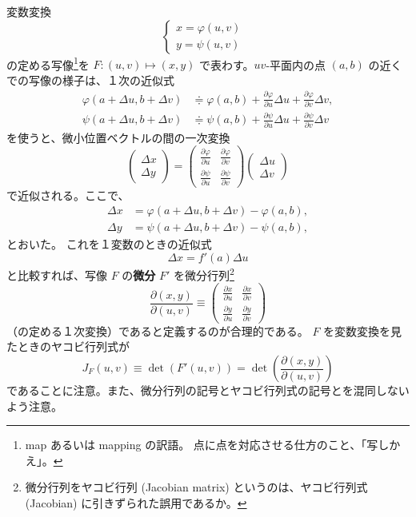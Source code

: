 \documentclass[a4paper]{jsarticle}
\theoremstyle{definition}
\theoremstyle{remark}
\newcommand{\del}{\partial}
\begin{document}
変数変換
\[
\begin{cases}
x = \varphi(u,v) &\\
y = \psi(u,v) &
\end{cases}
\]
の定める写像\footnote{map あるいは mapping の訳語。
点に点を対応させる仕方のこと、「写しかえ」。}を $F: (u,v) \mapsto (x,y)$ で表わす。$uv$-平面内の点
$(a,b)$ の近くでの写像の様子は、１次の近似式
\begin{align*}
\varphi(a+\Delta u,b+\Delta v) &\doteqdot \varphi(a,b) + 
\frac{\del \varphi}{\del u}\Delta u + \frac{\del \varphi}{\del v}\Delta v,\\
\psi(a+\Delta u,b+\Delta v) &\doteqdot \psi(a,b) + 
\frac{\del \psi}{\del u}\Delta u + \frac{\del \psi}{\del v}\Delta v
\end{align*}
を使うと、微小位置ベクトルの間の一次変換
\[
\begin{pmatrix}
\Delta x\\ \Delta y
\end{pmatrix}
= 
\begin{pmatrix}
\frac{\del \varphi}{\del u} & \frac{\del \varphi}{\del v}\\
\frac{\del \psi}{\del u} & \frac{\del \psi}{\del v}
\end{pmatrix}
\begin{pmatrix}
\Delta u\\ \Delta v
\end{pmatrix}
\]
で近似される。ここで、
\begin{align*}
\Delta x &= \varphi(a+\Delta u,b+\Delta v) - \varphi(a,b),\\
\Delta y &= \psi(a+\Delta u,b+\Delta v) - \psi(a,b),
\end{align*}
とおいた。
これを１変数のときの近似式
\[
\Delta x = f'(a) \Delta u
\]
と比較すれば、写像 $F$ の{\bf 微分} $F'$ を微分行列\footnote{微分行列をヤコビ行列 (Jacobian matrix) というのは、ヤコビ行列式 (Jacobian) に引きずられた誤用であるか。}
\[
\frac{\del(x,y)}{\del(u,v)} \equiv 
\begin{pmatrix}
\displaystyle{\frac{\del x}{\del u}} 
& \displaystyle{\frac{\del x}{\del v}}\\
\displaystyle{\frac{\del y}{\del u}} 
& \displaystyle{\frac{\del y}{\del v}}
\end{pmatrix}
\]
（の定める１次変換）であると定義するのが合理的である。
$F$ を変数変換を見たときのヤコビ行列式が
\[
  J_F(u,v) \equiv \det(F'(u,v)) = \det\left(\frac{\del(x,y)}{\del(u,v)}\right) 
\]
であることに注意。また、微分行列の記号とヤコビ行列式の記号とを混同しないよう注意。
\end{document}
